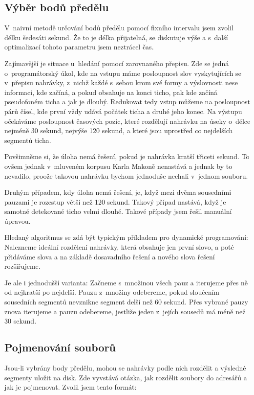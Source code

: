 \subsection{Výběr bodů předělu}

V~naivní metodě určování bodů předělu pomocí fixního intervalu jsem zvolil délku
šedesáti sekund. Že to je délka přijatelná, se diskutuje výše a s~další
optimalizací tohoto parametru jsem neztrácel čas.

Zajímavější je situace u~hledání pomocí zarovnaného přepisu. Zde se jedná
o~programátorský úkol, kde na vstupu máme posloupnost slov vyskytujících se
v~přepisu nahrávky, z~nichž každé s~sebou krom své formy a výslovnosti nese
informaci, kde začíná, a pokud obsahuje na konci ticho, pak kde začíná
pseudofoném ticha a jak je dlouhý.  Redukovat tedy vstup můžeme na posloupnost
párů čísel, kde první vždy udává počátek ticha a druhé jeho konec. Na výstupu
očekáváme posloupnost časových pozic, které rozdělují nahrávku na úseky o~délce
nejméně 30 sekund, nejvýše 120 sekund, a které jsou uprostřed co nejdelších
segmentů ticha.

Povšimněme si, že úloha nemá řešení, pokud je nahrávka kratší třiceti sekund. To
ovšem jednak v~mluveném korpusu Karla Makoně nenastává a jednak by to nevadilo,
proože takovou nahrávku bychom jednoduše nechali v~jednom souboru.

Druhým případem, kdy úloha nemá řešení, je, když mezi dvěma sousedními pauzami
je rozestup větší než 120 sekund. Takový případ nastává, když je samotné
detekované ticho velmi dlouhé. Takové případy jsem řešil manuální úpravou.

Hledaný algoritmus se zdá být typickým příkladem pro dynamické programování:
Nalezneme ideální rozdělení nahrávky, která obsahuje jen první slovo, a poté
přidáváme slova a na základě dosavadního řešení a nového slova řešení
rozšiřujeme.

Je ale i jednodušší varianta: Začneme s~množinou všech pauz a iterujeme přes ně
od nejkratší po nejdelší. Pauzu z~množiny odebereme, pokud sloučením sousedních
segmentů nevznikne segment delší než 60 sekund. Přes vybrané pauzy znova
iterujeme a pauzu odebereme, jestliže jeden z~jejích sousedů má méně než 30
sekund.

\subsection{Pojmenování souborů}

Jsou-li vybrány body předělu, mohou se nahrávky podle nich rozdělit a výsledné
segmenty uložit na disk. Zde vyvstává otázka, jak rozdělit soubory do adresářů a
jak je pojmenovat. Zvolil jsem tento formát:

